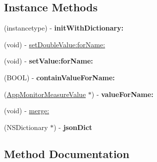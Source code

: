 \subsection*{Instance Methods}
\begin{DoxyCompactItemize}
\item 
\mbox{\label{interface_app_monitor_measure_value_set_ad9a41dcbec2a572a75c95d3b6a353bfc}} 
(instancetype) -\/ {\bfseries init\+With\+Dictionary\+:}
\item 
(void) -\/ \mbox{\hyperlink{interface_app_monitor_measure_value_set_a5bcef99549e7aa6dc261fac6402d198b}{set\+Double\+Value\+:for\+Name\+:}}
\item 
\mbox{\label{interface_app_monitor_measure_value_set_a70ee371dd6457973daa00fd1e7afb105}} 
(void) -\/ {\bfseries set\+Value\+:for\+Name\+:}
\item 
\mbox{\label{interface_app_monitor_measure_value_set_a403bf6a23e1339fdcafc76a9d1287358}} 
(B\+O\+OL) -\/ {\bfseries contain\+Value\+For\+Name\+:}
\item 
\mbox{\label{interface_app_monitor_measure_value_set_a846252c505861f79a3eb607d160b58ae}} 
(\mbox{\hyperlink{interface_app_monitor_measure_value}{App\+Monitor\+Measure\+Value}} $\ast$) -\/ {\bfseries value\+For\+Name\+:}
\item 
(void) -\/ \mbox{\hyperlink{interface_app_monitor_measure_value_set_a8ea003c7a63d6c0d7ff0e23be719aad1}{merge\+:}}
\item 
\mbox{\label{interface_app_monitor_measure_value_set_a32e7e694e5924d06a3fa3fb3ca6f40af}} 
(N\+S\+Dictionary $\ast$) -\/ {\bfseries json\+Dict}
\end{DoxyCompactItemize}


\subsection{Method Documentation}
\mbox{\label{interface_app_monitor_measure_value_set_a8ea003c7a63d6c0d7ff0e23be719aad1}} 
